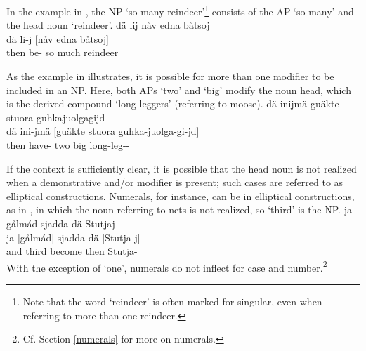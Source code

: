 In the example in , the NP  ‘so many reindeer’\footnote{Note that the word  ‘reindeer’ is often marked for singular, even when referring to more than one reindeer.} 
consists of the AP  ‘so many’ and the head noun  ‘reindeer’. 
\ea\label{NPstructureEx3}%
\glll	dä lij nåv edna båtsoj\\
	dä li-j [nåv edna {båtsoj]\subNP}\\
	then be- so much reindeer\BS{}\\\nopagebreak
{}	
\z

As the example in  illustrates, it is possible for more than one modifier to be included in an NP. Here, both APs  ‘two’ and  ‘big’ modify the noun head, which is the derived compound  ‘long-leggers’ (referring to moose). 
\ea\label{NPstructureEx4}%
\glll	dä inijmä guäkte stuora guhkajuolgagijd\\
	dä ini-jmä [guäkte stuora {guhka-juolga-gi-jd]\subNP}\\
	then have- two big long-leg--\\\nopagebreak
{}	
\z

If the context is sufficiently clear, it is possible that the head noun is not realized when a demonstrative and/or modifier is present; such cases are referred to as elliptical constructions. 
Numerals, for instance, can be in elliptical constructions, %
as in , in which the noun referring to nets is not realized, so  ‘third’ is the NP. %
\ea\label{NPstructureEx6}
\glll	ja gålmád sjadda dä Stutjaj\\
	ja {[gålmád]\subNP{}} sjadda dä {[Stutja-j]\subNP{}}\\
	and third become\BS{} then Stutja-\\\nopagebreak
{}	
\z
With the exception of  ‘one’, numerals do not inflect for case and number.\footnote{Cf. Section \ref{numerals} for more on numerals.}

